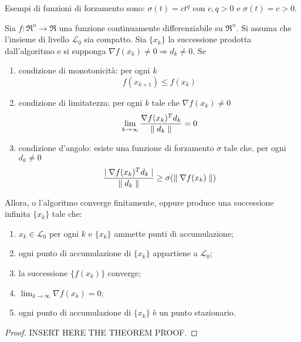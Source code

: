 Esempi di funzioni di forzamento sono: $\sigma(t)=ct^{q}$ con $c,q>0$ e $\sigma(t)=c>0$.

\begin{theorem}
	\label{thm:convergence-condition-1}
	Sia $f:\Re^{n}\rightarrow\Re$ una funzione continuamente differenziabile su $\Re^{n}$. Si assuma che l'insieme di livello $\mathcal{L}_{0}$ sia compatto. Sia $\{x_{k}\}$ la successione prodotta dall'algoritmo e si supponga $\nabla f(x_{k})\neq 0\Rightarrow d_{k}\neq 0$.
	Se
	\begin{enumerate}
		\item condizione di monotonicità:
		per ogni $k$
		\begin{equation}
		f(x_{k+1})\leq f(x_{k})
		\end{equation}

		\item condizione di limitatezza:
		per ogni $k$ tale che $\nabla f(x_{k})\neq 0$
		\begin{equation}
		\lim_{k\rightarrow\infty}\frac{\nabla f(x_{k})^{T}d_{k}}{\parallel d_{k} \parallel}=0
		\end{equation}

		\item condizione d'angolo:
		esiste una funzione di forzamento $\sigma$ tale che, per ogni $d_{k}\neq 0$
		\begin{equation}
		\frac{\mid \nabla f(x_{k})^{T}d_{k} \mid}{\parallel d_{k} \parallel}\geq\sigma(\parallel \nabla f(x_{k}) \parallel)
		\end{equation}
	\end{enumerate}

	Allora, o l'algoritmo converge finitamente, oppure produce una successione infinita $\{x_{k}\}$ tale che:

	\begin{enumerate}
		\item $x_{k}\in\mathcal{L}_{0}$ per ogni $k$ e $\{x_{k}\}$ ammette punti di accumulazione;

		\item ogni punto di accumulazione di $\{x_{k}\}$ appartiene a $\mathcal{L}_{0}$;

		\item la successione $\{f(x_{k})\}$ converge;

		\item $\lim_{k\rightarrow\infty}\nabla f(x_{k})=0$;

		\item ogni punto di accumulazione di $\{x_{k}\}$ è un punto stazionario.
	\end{enumerate}

	\begin{proof}
		INSERT HERE THE THEOREM PROOF.
	\end{proof}
\end{theorem}

